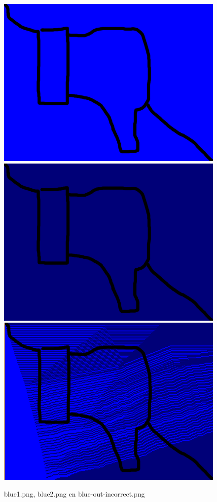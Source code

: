 \documentclass{article}
\begin{document}
\begin{figure}[h!]
\centering
\includegraphics[scale=0.17]{blue1.png}
\includegraphics[scale=0.17]{blue2.png}
\includegraphics[scale=0.17]{blue-out.png}
\caption{blue1.png, blue2.png en blue-out-incorrect.png}
\label{fig:Blue}
\end{figure}
\end{document}
